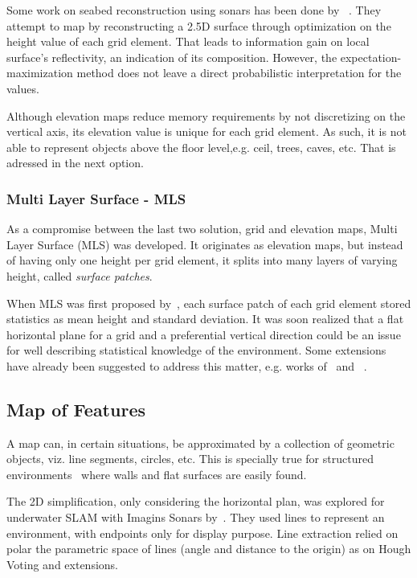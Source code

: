 Some work on seabed reconstruction using sonars has been done by
~\citet{Coiras2007,Coiras2009}. They attempt to map by reconstructing a
2.5D surface through optimization on the height value of each grid element. That
leads to information gain on local surface's reflectivity, an indication of its
composition. However, the expectation-maximization method does not leave a
direct probabilistic interpretation for the values.

Although elevation maps reduce memory requirements by not discretizing on
the vertical axis, its elevation value is unique for each grid element. As such,
it is not able to represent objects above the floor level,e.g. ceil, trees,
caves, etc. That is adressed in the next option.

\subsubsection{Multi Layer Surface - MLS}

As a compromise between the last two solution, grid and elevation maps, Multi
Layer Surface (MLS) was developed. It originates as elevation maps, but instead
of having only one height per grid element, it splits into many layers of
varying height, called \textit{surface patches}.

When MLS was first proposed by~\citet{triebel2006multi}, each surface patch of
each grid element stored statistics as mean height and standard deviation. It
was soon realized that a flat horizontal plane for a grid and a preferential
vertical direction could be an issue for well describing statistical knowledge
of the environment. Some extensions have already been suggested to address this
matter, e.g. works of~\citet{rivadeneyra2011probabilistic} and
~\citet{Schwendner2013}.

\subsection{Map of Features}
\label{ss:mapsoffeatures}
A map can, in certain situations, be approximated by a collection of geometric
objects, viz. line segments, circles, etc. This is specially true for structured
environments~\cite{Ribas2006} where walls and flat surfaces are easily found.

The 2D simplification, only considering the horizontal plan, was explored for
underwater SLAM with Imagins Sonars by~\citet{ribas2010underwater}. They used
lines to represent an environment, with endpoints only for display purpose. Line
extraction relied on polar the parametric space of lines (angle and distance to
the origin) as on Hough Voting and extensions.

